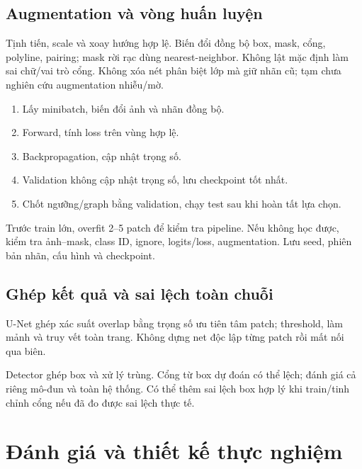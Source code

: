 \documentclass[11pt,a4paper]{article}
\begin{document}
\subsection{Augmentation và vòng huấn luyện}
Tịnh tiến, scale và xoay hướng hợp lệ. Biến đổi đồng bộ box, mask, cổng, polyline, pairing; mask rời rạc dùng nearest-neighbor. Không lật mặc định làm sai chữ/vai trò cổng. Không xóa nét phân biệt lớp mà giữ nhãn cũ; tạm chưa nghiên cứu augmentation nhiễu/mờ.
\begin{enumerate}
  \item Lấy minibatch, biến đổi ảnh và nhãn đồng bộ.
  \item Forward, tính loss trên vùng hợp lệ.
  \item Backpropagation, cập nhật trọng số.
  \item Validation không cập nhật trọng số, lưu checkpoint tốt nhất.
  \item Chốt ngưỡng/graph bằng validation, chạy test sau khi hoàn tất lựa chọn.
\end{enumerate}
Trước train lớn, overfit 2--5 patch để kiểm tra pipeline. Nếu không học được, kiểm tra ảnh--mask, class ID, ignore, logits/loss, augmentation. Lưu seed, phiên bản nhãn, cấu hình và checkpoint.

\subsection{Ghép kết quả và sai lệch toàn chuỗi}
U-Net ghép xác suất overlap bằng trọng số ưu tiên tâm patch; threshold, làm mảnh và truy vết toàn trang. Không dựng net độc lập từng patch rồi mất nối qua biên.

Detector ghép box và xử lý trùng. Cổng từ box dự đoán có thể lệch; đánh giá cả riêng mô-đun và toàn hệ thống. Có thể thêm sai lệch box hợp lý khi train/tinh chỉnh cổng nếu đã đo được sai lệch thực tế.

\section{Đánh giá và thiết kế thực nghiệm}
\end{document}
